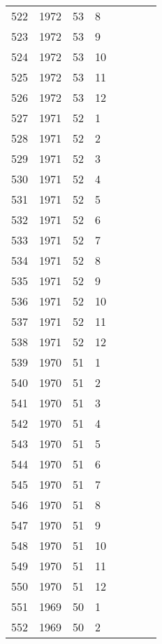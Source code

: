 \begin{longtable}{ |l|l|l|l|l|l|l|l| }
522 & 1972 & 53 &     8 &         &  &  & \\
523 & 1972 & 53 &     9 &         &  &  & \\
524 & 1972 & 53 &    10 &         &  &  & \\
525 & 1972 & 53 &    11 &         &  &  & \\
526 & 1972 & 53 &    12 &         &  &  & \\
527 & 1971 & 52 &     1 &         &  &  & \\
528 & 1971 & 52 &     2 &         &    &  & \\
529 & 1971 & 52 &     3 &         &   &  & \\
530 & 1971 & 52 &     4 &         &  &  & \\
531 & 1971 & 52 &     5 &         &  &  & \\
532 & 1971 & 52 &     6 &         &  &  & \\
533 & 1971 & 52 &     7 &         &  &  & \\
534 & 1971 & 52 &     8 &         &  &  & \\
535 & 1971 & 52 &     9 &         &  &  & \\
536 & 1971 & 52 &    10 &         &  &  & \\
537 & 1971 & 52 &    11 &         &  &  & \\
538 & 1971 & 52 &    12 &         &  &  & \\
539 & 1970 & 51 &     1 &         &  &  & \\
540 & 1970 & 51 &     2 &         &  &  & \\
541 & 1970 & 51 &     3 &         &  &  & \\
542 & 1970 & 51 &     4 &         &  &  & \\
543 & 1970 & 51 &     5 &         &  &  & \\
544 & 1970 & 51 &     6 &         &  &  & \\
545 & 1970 & 51 &     7 &         &  &  & \\
546 & 1970 & 51 &     8 &         &  &  & \\
547 & 1970 & 51 &     9 &         &  &  & \\
548 & 1970 & 51 &    10 &         &  &  & \\
549 & 1970 & 51 &    11 &         &  &  & \\
550 & 1970 & 51 &    12 &         &  &  & \\
551 & 1969 & 50 &     1 &         &  &  & \\
552 & 1969 & 50 &     2 &         &  &  & \\

\end{longtable}
